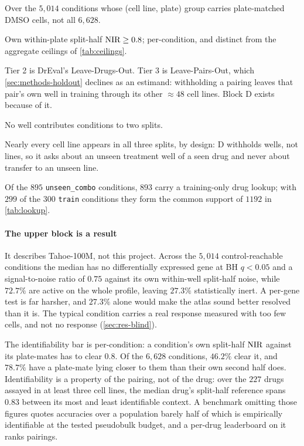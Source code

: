 \begin{table}[htbp]
\begin{fullwidth}
\begin{minipage}{\linewidth}
\begin{threeparttable}
\begin{tablenotes}[flushleft]
\item[a] Over the $5{,}014$ conditions whose (cell line, plate) group carries
plate-matched DMSO cells, not all $6{,}628$.
\item[b] Own within-plate split-half $\textrm{NIR} \geq 0.8$; per-condition, and distinct
from the aggregate ceilings of \cref{tab:ceilings}.
\item[c] Tier 2 is DrEval's Leave-Drugs-Out. Tier 3 is Leave-Pairs-Out, which
\cref{sec:methods-holdout} declines as an estimand: withholding a pairing leaves
that pair's own well in training through its other $\approx 48$ cell lines.
Block D exists because of it.
\item[d] No well contributes conditions to two splits.
\item[e] Nearly every cell line appears in all three splits, by design: D
withholds wells, not lines, so it asks about an unseen treatment well of a seen
drug and never about transfer to an unseen line.
\item Of the $895$ \texttt{unseen\_combo} conditions, $893$ carry a training-only
drug lookup; with $299$ of the $300$ \texttt{train} conditions they form the
common support of $\num{1192}$ in \cref{tab:lookup}.
\end{tablenotes}
\end{threeparttable}
\end{minipage}
\end{fullwidth}
\end{table}

\paragraph{The upper block is a result} It describes Tahoe-100M, not this
project. Across the $5{,}014$ control-reachable conditions the median has no
differentially expressed gene at BH $q<0.05$ and a signal-to-noise ratio of
$0.75$ against its own within-well split-half noise, while $72.7\%$ are active
on the whole profile, leaving $27.3\%$ statistically inert. A per-gene test is
far harsher, and $27.3\%$ alone would make the atlas sound better resolved than
it is. The typical condition carries a real response
measured with too few cells, and not no response (\cref{sec:res-blind}).

The identifiability bar is per-condition: a condition's own split-half $\textrm{NIR}$
against its plate-mates has to clear $0.8$. Of the $6{,}628$ conditions,
$46.2\%$ clear it, and $78.7\%$ have a plate-mate lying closer to them than
their own second half does. Identifiability is a property of the pairing, not of
the drug: over the $227$ drugs assayed in at least three cell lines, the median
drug's split-half reference spans $0.83$ between its most and least identifiable
context. A benchmark omitting those figures
quotes accuracies over a population barely half of which is empirically
identifiable at the tested pseudobulk budget, and a per-drug leaderboard on it
ranks pairings.

